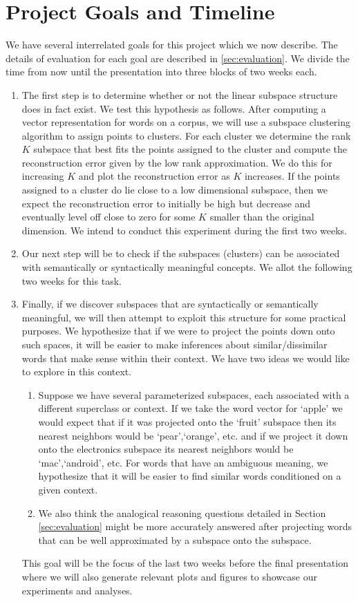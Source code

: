 \section{Project Goals and Timeline}\label{sec:timeline}

We have several interrelated goals for this project which we now describe. 
The details of evaluation for each goal are described in \ref{sec:evaluation}.
We divide the time from now until the presentation into three blocks of two weeks each.
 \begin{enumerate}
\item The first step is to determine whether or not the linear subspace structure does in fact exist. 
We test this hypothesis as follows. 
 After computing a vector representation for words on a corpus, we will use a subspace clustering algorithm to assign points to clusters. 
For each cluster we determine the rank $K$ subspace that best fits the points assigned to the cluster and compute the reconstruction error given by the low rank approximation. 
We do this for increasing $K$ and plot the reconstruction error as $K$ increases. 
If the points assigned to a cluster do lie close to a low dimensional subspace, then we expect the reconstruction error to initially be high but decrease and eventually level off close to zero for some $K$ smaller than the original dimension. 
We intend to conduct this experiment during the first two weeks.
 
\item Our next step will be to check if the subspaces (clusters) can be associated with semantically or syntactically meaningful concepts.
We allot the following two weeks for this task. 

\item Finally, if we discover subspaces that are syntactically or semantically meaningful, we will then attempt to exploit this structure for some practical purposes. 
We hypothesize that if we were to project the points down onto such spaces, it will be easier to make inferences about similar/dissimilar words that make sense within their context. We have two ideas we would like to explore in this context. 
	\begin{enumerate}
		\item Suppose we have several parameterized subspaces, each associated with a different superclass or context. 
If we take the word vector for `apple' we would expect that if it was projected onto the `fruit' subspace then its nearest neighbors would be `pear',`orange', etc. and if we project it down onto the electronics subspace its nearest neighbors would be `mac',`android', etc. 
For words that have an ambiguous meaning,  we hypothesize that it will be easier to find similar words conditioned on a given context. 
		\item We also think the analogical reasoning questions detailed in Section \ref{sec:evaluation} might be more accurately answered after projecting words that can be well approximated by a subspace onto the subspace. 
	\end{enumerate} 
	
This goal will be the focus of the last two weeks before the final presentation where we will also generate relevant plots and figures to showcase our experiments and analyses.
\end{enumerate}

